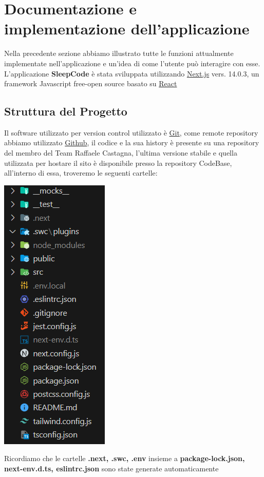 \documentclass[11pt, a4paper]{article}
\theoremstyle{definition}
\begin{document}
\newpage
\section{Documentazione e implementazione dell'applicazione}
Nella precedente sezione abbiamo illustrato tutte le funzioni attualmente implementate nell'applicazione e un'idea di come l'utente può interagire con esse.
L'applicazione \textbf{SleepCode} è stata sviluppata utilizzando \href{https://nextjs.org/}{Next.js} vers. 14.0.3, un framework Javascript free-open source basato su \href{https://react.dev/}{React}

\subsection{Struttura del Progetto}
Il software utilizzato per version control utilizzato è \href{https://git-scm.com/}{Git}, come remote repository abbiamo utilizzato \href{www.github.com}{Github},
il codice e la sua history è presente su una repository del membro del Team Raffaele Castagna, l'ultima versione stabile e quella utilizzata per hostare il sito è disponibile presso la repository CodeBase, all'interno di essa,
troveremo le seguenti cartelle:
\\
\begin{center}
  \includegraphics{materiale/Project Structure.png}
\end{center}
Ricordiamo che le cartelle \textbf{.next, .swc, .env} insieme a \textbf{package-lock.json, next-env.d.ts, eslintrc.json} sono state generate automaticamente
\newpage
\end{document}
